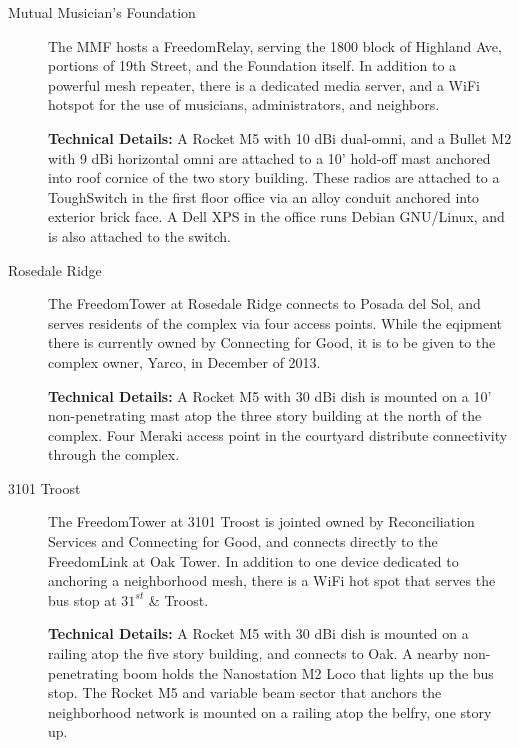 \begin{description}
\item[Mutual Musician's Foundation] The MMF hosts a FreedomRelay, serving the
1800 block of Highland Ave, portions of 19th Street, and the Foundation itself.
In addition to a powerful mesh repeater, there is a dedicated media server, and a WiFi hotspot for the use
of musicians, administrators, and neighbors. \par
{\bf Technical Details:} A Rocket M5 with 10 dBi dual-omni, and a Bullet M2 with
9 dBi horizontal omni are attached to a 10'
hold-off mast anchored into roof cornice of the two story building. These radios
are attached to a ToughSwitch in the
first floor office via an alloy conduit anchored into exterior brick face. A
Dell XPS in the office runs Debian GNU/Linux, and is also attached to the
switch. 

\item[Rosedale Ridge]
The FreedomTower at Rosedale Ridge connects to Posada del Sol, and serves
residents of the complex via four access points. While the eqipment there is currently owned
by Connecting for Good, it is to be given to the complex owner, Yarco,
in December of 2013. \par
{\bf Technical Details:} A Rocket M5 with 30 dBi dish is mounted on a 10'
non-penetrating mast atop the three story building at the north of the complex.
Four Meraki access point in the courtyard distribute connectivity through the
complex.

\item[3101 Troost] The FreedomTower at 3101 Troost is jointed owned by
Reconciliation Services and Connecting for Good, and connects directly to the
FreedomLink at Oak Tower. In addition to one device dedicated to anchoring a
neighborhood mesh, there is a WiFi hot spot that serves the bus stop at
$31^{st}$ \& Troost. \par
{\bf Technical Details:} A Rocket M5 with 30 dBi dish is mounted on a railing
atop the five story building, and connects to Oak. A nearby non-penetrating boom
holds the Nanostation M2 Loco that lights up the bus stop. The Rocket M5 and
variable beam sector
that anchors the neighborhood network is mounted on a railing atop the belfry, one story up. 
\end{description}

